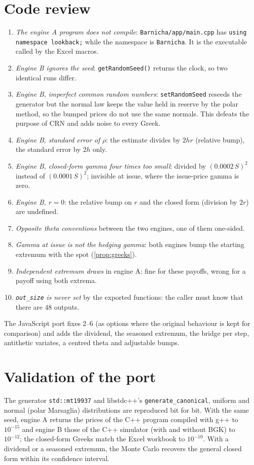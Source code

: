\documentclass[11pt,a4paper]{article}
\theoremstyle{remark}
\begin{document}
\section{Code review}\label{sec:review}
\begin{enumerate}
  \item \emph{The engine A program does not compile}: \texttt{Barnicha/app/main.cpp} has \texttt{using namespace lookback;} while the
        namespace is \texttt{Barnicha}. It is the executable called by the Excel macros.
  \item \emph{Engine B ignores the seed}: \texttt{getRandomSeed()} returns the clock, so two identical runs differ.
  \item \emph{Engine B, imperfect common random numbers}: \texttt{setRandomSeed} reseeds the generator but the normal law keeps the
        value held in reserve by the polar method, so the bumped prices do not use the same normals. This defeats the purpose of
        CRN and adds noise to every Greek.
  \item \emph{Engine B, standard error of $\rho$}: the estimate divides by $2hr$ (relative bump), the standard error by $2h$ only.
  \item \emph{Engine B, closed-form gamma four times too small}: divided by $(0.0002\,S)^2$ instead of $(0.0001\,S)^2$; invisible at
        issue, where the issue-price gamma is zero.
  \item \emph{Engine B, $r=0$}: the relative bump on $r$ and the closed form (division by $2r$) are undefined.
  \item \emph{Opposite theta conventions} between the two engines, one of them one-sided.
  \item \emph{Gamma at issue is not the hedging gamma}: both engines bump the starting extremum with the spot (\cref{prop:greeks}).
  \item \emph{Independent extremum draws} in engine A: fine for these payoffs, wrong for a payoff using both extrema.
  \item \emph{\texttt{out\_size} is never set} by the exported functions: the caller must know that there are 48 outputs.
\end{enumerate}
The JavaScript port fixes 2--6 (as options where the original behaviour is kept for comparison) and adds the dividend, the
seasoned extremum, the bridge per step, antithetic variates, a centred theta and adjustable bumps.

\section{Validation of the port}
The generator \texttt{std::mt19937} and libstdc++'s \texttt{generate\_canonical}, uniform and normal (polar Marsaglia)
distributions are reproduced bit for bit. With the same seed, engine A returns the prices of the C++ program compiled with g++
to $10^{-15}$ and engine B those of the C++ simulator (with and without BGK) to $10^{-12}$; the closed-form Greeks match the Excel
workbook to $10^{-10}$. With a dividend or a seasoned extremum, the Monte Carlo recovers the general closed form within its
confidence interval.
\end{document}
